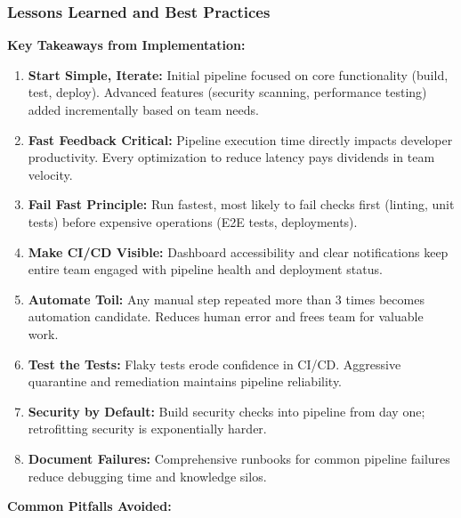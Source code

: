 \documentclass[12pt,a4paper]{article}
\begin{document}
\subsubsection{Lessons Learned and Best Practices}

\textbf{Key Takeaways from Implementation:}

\begin{enumerate}[leftmargin=2em, itemsep=6pt]
    \item \textbf{Start Simple, Iterate:} Initial pipeline focused on core functionality (build, test, deploy). Advanced features (security scanning, performance testing) added incrementally based on team needs.
    
    \item \textbf{Fast Feedback Critical:} Pipeline execution time directly impacts developer productivity. Every optimization to reduce latency pays dividends in team velocity.
    
    \item \textbf{Fail Fast Principle:} Run fastest, most likely to fail checks first (linting, unit tests) before expensive operations (E2E tests, deployments).
    
    \item \textbf{Make CI/CD Visible:} Dashboard accessibility and clear notifications keep entire team engaged with pipeline health and deployment status.
    
    \item \textbf{Automate Toil:} Any manual step repeated more than 3 times becomes automation candidate. Reduces human error and frees team for valuable work.
    
    \item \textbf{Test the Tests:} Flaky tests erode confidence in CI/CD. Aggressive quarantine and remediation maintains pipeline reliability.
    
    \item \textbf{Security by Default:} Build security checks into pipeline from day one; retrofitting security is exponentially harder.
    
    \item \textbf{Document Failures:} Comprehensive runbooks for common pipeline failures reduce debugging time and knowledge silos.
\end{enumerate}

\vspace{0.5em}

\textbf{Common Pitfalls Avoided:}
\end{document}
